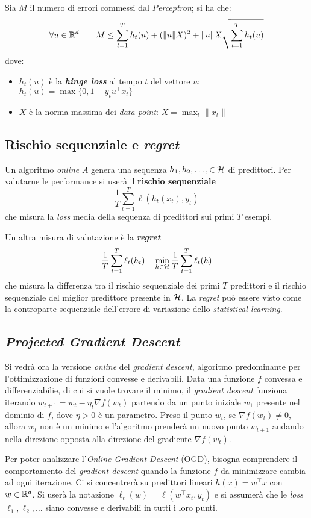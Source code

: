 Sia $M$ il numero di errori commessi dal \textit{Perceptron}; si ha che:
$$\forall u\in\mathbb{R}^d \qquad
M \leq \sum_{t=1}^{T}h_t(u)+(\|u\|X)^2+\|u\|X\sqrt{\sum_{t=1}^{T}h_t(u)} $$
dove:
\begin{itemize}
    \item $h_t(u)$ è la \textbf{\textit{hinge loss}} al tempo $t$ del vettore
        $u$: $h_t(u) = \max{\{0,1-y_tu^\top x_t\}}$
    \item $X$ è la norma massima dei \textit{data point}: $X=\max_t{\|x_t\|}$
\end{itemize}

\subsection{Rischio sequenziale e \textit{regret}}
Un algoritmo \textit{online} $A$ genera una sequenza
$h_1,h_2,\dots,\in\mathcal{H}$ di predittori. Per valutarne le performance si userà
il \textbf{rischio sequenziale}
$$ \frac{1}{T}\sum_{t=1}^{T}\ell(h_t(x_t),y_t) $$
che misura la \textit{loss} media della sequenza di predittori sui primi $T$
esempi.

Un altra misura di valutazione è la \textbf{\textit{regret}}
$$
\frac{1}{T}\sum_{t=1}^{T}\ell_t(h_t)-
\min_{h\in\mathcal{H}}\frac{1}{T}\sum_{t=1}^{T}\ell_t(h)
$$
che misura la differenza tra il rischio sequenziale dei primi $T$ predittori
e il rischio sequenziale del miglior predittore presente in $\mathcal{H}$. La
\textit{regret} può essere visto come la controparte sequenziale dell'errore
di variazione dello \textit{statistical learning}.

\subsection{\textit{Projected Gradient Descent}}
Si vedrà ora la versione \textit{online} del \textit{gradient descent},
algoritmo predominante per l'ottimizzazione di funzioni convesse e derivabili.
Data una funzione $f$ convessa e differenziabilie, di cui si vuole trovare il 
minimo, il \textit{gradient descent} funziona iterando 
$w_{t+1}=w_t-\eta_t\nabla f(w_t)$ partendo da un punto iniziale $w_1$ presente
nel dominio di $f$, dove $\eta>0$ è un parametro. Preso il punto $w_t$, se
$\nabla f(w_t)\neq 0$, allora $w_t$ non è un minimo e l'algoritmo prenderà
un nuovo punto $w_{t+1}$ andando nella direzione opposta alla direzione del
gradiente $\nabla f(w_t)$.

Per poter analizzare l'\textit{Online Gradient Descent} (OGD), bisogna
comprendere il comportamento del \textit{gradient descent} quando la funzione
$f$ da minimizzare cambia ad ogni iterazione. Ci si concentrerà su predittori
lineari $h(x)=w^\top x$ con $w\in\mathbb{R}^d$. Si userà la notazione
$\ell_t(w) = \ell(w^\top x_t,y_t)$ e si assumerà che le \textit{loss}
$\ell_1,\ell_2,\dots$ siano convesse e derivabili in tutti i loro punti.

